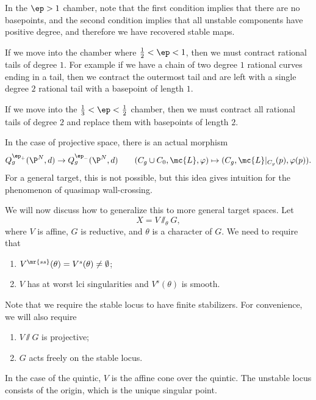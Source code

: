 \begin{exm}
    In the \(\ep > 1\) chamber, note that the first condition implies that there are no basepoints, and the second condition implies that all unstable components have positive degree, and therefore we have recovered stable maps.

    If we move into the chamber where \(\frac{1}{2} < \ep < 1\), then we must contract rational tails of degree \(1\). For example if we have a chain of two degree \(1\) rational curves ending in a tail, then we contract the outermost tail and are left with a single degree \(2\) rational tail with a basepoint of length \(1\). 

    If we move into the \(\frac{1}{3} < \ep < \frac{1}{2}\) chamber, then we must contract all rational tails of degree \(2\) and replace them with basepoints of length \(2\). 
\end{exm}

\begin{rmk}
    In the case of projective space, there is an actual morphism
    \[ Q_g^{\ep_+}(\P^N, d) \to Q_g^{\ep_-}(\P^N, d) \qquad (C_g \cup C_0, \mc{L}, \varphi) \mapsto (C_g, \mc{L}|_{C_g}(p), \varphi(p)). \]
    For a general target, this is not possible, but this idea gives intuition for the phenomenon of quasimap wall-crossing.
\end{rmk}

We will now discuss how to generalize this to more general target spaces. Let
\[ X = V \sslash_{\theta} G, \]
where \(V\) is affine, \(G\) is reductive, and \(\theta\) is a character of \(G\). We need to require that
\begin{enumerate}
    \item \(V^{\mr{ss}}(\theta) = V^s(\theta) \neq \emptyset\);
    \item \(V\) has at worst lci singularities and \(V^s(\theta)\) is smooth.
\end{enumerate}
Note that we require the stable locus to have finite stabilizers. For convenience, we will also require
\begin{enumerate}
    \item \(V \sslash G\) is projective;
    \item \(G\) acts freely on the stable locus.
\end{enumerate}

\begin{exm}
    In the case of the quintic, \(V\) is the affine cone over the quintic. The unstable locus consists of the origin, which is the unique singular point.
\end{exm}

